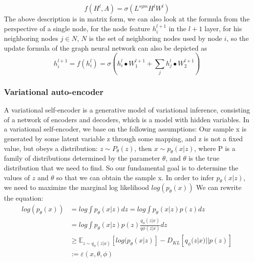 \documentclass[%
reprint,
amsmath,amssymb,
aps,
]{revtex4-2}
\begin{document}
	\begin{equation}\label{LapalceMatrix}
	f(H^l,A) = \sigma(L^{sym} H^l W^l)	
	\end{equation}
	The above description is in matrix form, we can also look at the formula from the perspective of a single node, for the node feature $h^{l+1}_i$ in the $l+1$ layer, for his neighboring nodes $j \in N$, $N$ is the set of neighboring nodes used by node $i$, so the update formula of the graph neural network can also be depicted as
	\begin{equation}\label{formulaNode}
		h^{l+1}_i = f(h^{l}_i) = \sigma(h^{l}_i \bullet W_1^{l+1} + \sum_j h^{l}_j \bullet W^{l+1}_2)
	\end{equation}
	\subsubsection{Variational auto-encoder}
	A variational self-encoder is a generative model of variational inference, consisting of a network of encoders and decoders, which is a model with hidden variables. In a variational self-encoder, we base on the following assumptions:
	Our sample x is generated by some latent variable z through some mapping, and z is not a fixed value, but obeys a distribution: $z \sim P_{\theta}(z)$, then $x \sim p_{\theta}(x|z)$, where P is a family of distributions determined by the parameter $\theta$, and $ \theta$ is the true distribution that we need to find. So our fundamental goal is to determine the values of $z$ and $\theta$ so that we can obtain the sample x. In order to infer $p_{\theta}(x|z)$, we need to maximize the marginal log likelihood $log(p_{\theta}(x))$ We can rewrite the equation:
	\begin{equation}\label{vae}
		\begin{aligned}
			log(p_{\theta}(x)) &= log \int p_{\theta}(x|z)dz = log \int p_{\theta}(x|z)p(z)dz \\
			&= log \int p_{\theta}(x|z)p(z)\frac{q_{\phi}(z|x)}{q{\phi}(z|x)}dz\\
			&\ge \mathbb E_{z \sim q_{\phi}(z|x)}[log(p_{\theta}(x|z)] - D_{KL}[q_{\phi}(z|x)||p(z)]\\
			&:= \varepsilon(x,\theta,\phi)
		\end{aligned}
	\end{equation}
\end{document}
